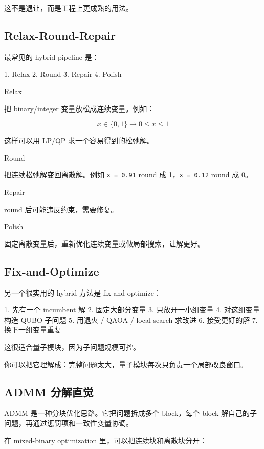 \documentclass[UTF8,12pt,a4paper]{ctexart}
\begin{document}
这不是退让，而是工程上更成熟的用法。

\subsection*{Relax-Round-Repair}

最常见的 hybrid pipeline 是：

\begin{GuideVerbatim}
1. Relax
2. Round
3. Repair
4. Polish
\end{GuideVerbatim}

Relax

把 binary/integer 变量放松成连续变量。例如：

\[
x \in \{0,1\}  \to  0 \le x \le 1
\]

这样可以用 LP/QP 求一个容易得到的松弛解。

Round

把连续松弛解变回离散解。例如 \texttt{x = 0.91} round 成 1，\texttt{x = 0.12} round 成 0。

Repair

round 后可能违反约束，需要修复。

Polish

固定离散变量后，重新优化连续变量或做局部搜索，让解更好。

\subsection*{Fix-and-Optimize}

另一个很实用的 hybrid 方法是 fix-and-optimize：

\begin{GuideVerbatim}
1. 先有一个 incumbent 解
2. 固定大部分变量
3. 只放开一小组变量
4. 对这组变量构造 QUBO 子问题
5. 用退火 / QAOA / local search 求改进
6. 接受更好的解
7. 换下一组变量重复
\end{GuideVerbatim}

这很适合量子模块，因为子问题规模可控。

你可以把它理解成：完整问题太大，量子模块每次只负责一个局部改良窗口。

\subsection*{ADMM 分解直觉}

ADMM 是一种分块优化思路。它把问题拆成多个 block，每个 block 解自己的子问题，再通过惩罚项和一致性变量协调。

在 mixed-binary optimization 里，可以把连续块和离散块分开：
\end{document}
